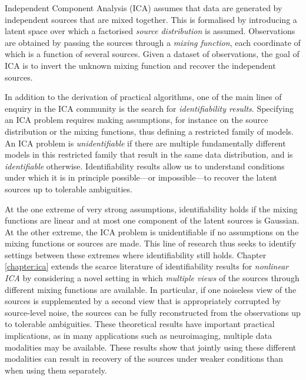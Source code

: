 Independent Component Analysis (ICA) assumes that data are generated by independent sources that are mixed together. 
This is formalised by introducing a latent space over which a factorised \emph{source distribution} is assumed. 
Observations are obtained by passing the sources through a \emph{mixing function}, each coordinate of which is a function of several sources.
Given a dataset of observations, the goal of ICA is to invert the unknown mixing function and recover the independent sources.

In addition to the derivation of practical algorithms, one of the main lines of enquiry in the ICA community is the search for \emph{identifiability results}.
Specifying an ICA problem requires making assumptions, for instance on the source distribution or the mixing functions, thus defining a restricted family of models.
An ICA problem is \emph{unidentifiable} if there are multiple fundamentally different models in this restricted family that result in the same data distribution, and is \emph{identifiable} otherwise.
Identifiability results allow us to understand conditions under which it is in principle possible---or impossible---to recover the latent sources up to tolerable ambiguities.


At the one extreme of very strong assumptions, identifiability holds if the mixing functions are linear and at most one component of the latent sources is Gaussian. 
At the other extreme, the ICA problem is unidentifiable if no assumptions on the mixing functions or sources are made. 
This line of research thus seeks to identify settings between these extremes where identifiability still holds. 
Chapter \ref{chapter:ica} extends the scarce literature of identifiability results for \emph{nonlinear ICA} by considering a novel setting in which \emph{multiple views} of the sources through different mixing functions are available.
In particular, if one noiseless view of the sources is supplemented by a second view that is appropriately corrupted by source-level noise, the sources can be fully reconstructed from the observations up to tolerable ambiguities.
These theoretical results have important practical implications, as in many applications such as neuroimaging, multiple data modalities may be available.
These results show that jointly using these different modalities can result in recovery of the sources under weaker conditions than when using them separately.

